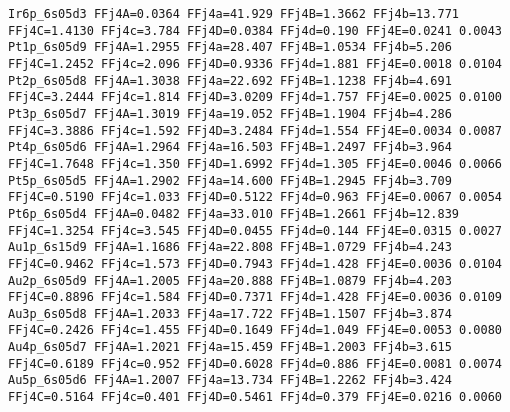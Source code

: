 {\begin{verbatim}
Ir6p_6s05d3 FFj4A=0.0364 FFj4a=41.929 FFj4B=1.3662 FFj4b=13.771 FFj4C=1.4130 FFj4c=3.784 FFj4D=0.0384 FFj4d=0.190 FFj4E=0.0241 0.0043 
Pt1p_6s05d9 FFj4A=1.2955 FFj4a=28.407 FFj4B=1.0534 FFj4b=5.206 FFj4C=1.2452 FFj4c=2.096 FFj4D=0.9336 FFj4d=1.881 FFj4E=0.0018 0.0104 
Pt2p_6s05d8 FFj4A=1.3038 FFj4a=22.692 FFj4B=1.1238 FFj4b=4.691 FFj4C=3.2444 FFj4c=1.814 FFj4D=3.0209 FFj4d=1.757 FFj4E=0.0025 0.0100 
Pt3p_6s05d7 FFj4A=1.3019 FFj4a=19.052 FFj4B=1.1904 FFj4b=4.286 FFj4C=3.3886 FFj4c=1.592 FFj4D=3.2484 FFj4d=1.554 FFj4E=0.0034 0.0087 
Pt4p_6s05d6 FFj4A=1.2964 FFj4a=16.503 FFj4B=1.2497 FFj4b=3.964 FFj4C=1.7648 FFj4c=1.350 FFj4D=1.6992 FFj4d=1.305 FFj4E=0.0046 0.0066 
Pt5p_6s05d5 FFj4A=1.2902 FFj4a=14.600 FFj4B=1.2945 FFj4b=3.709 FFj4C=0.5190 FFj4c=1.033 FFj4D=0.5122 FFj4d=0.963 FFj4E=0.0067 0.0054 
Pt6p_6s05d4 FFj4A=0.0482 FFj4a=33.010 FFj4B=1.2661 FFj4b=12.839 FFj4C=1.3254 FFj4c=3.545 FFj4D=0.0455 FFj4d=0.144 FFj4E=0.0315 0.0027 
Au1p_6s15d9 FFj4A=1.1686 FFj4a=22.808 FFj4B=1.0729 FFj4b=4.243 FFj4C=0.9462 FFj4c=1.573 FFj4D=0.7943 FFj4d=1.428 FFj4E=0.0036 0.0104 
Au2p_6s05d9 FFj4A=1.2005 FFj4a=20.888 FFj4B=1.0879 FFj4b=4.203 FFj4C=0.8896 FFj4c=1.584 FFj4D=0.7371 FFj4d=1.428 FFj4E=0.0036 0.0109 
Au3p_6s05d8 FFj4A=1.2033 FFj4a=17.722 FFj4B=1.1507 FFj4b=3.874 FFj4C=0.2426 FFj4c=1.455 FFj4D=0.1649 FFj4d=1.049 FFj4E=0.0053 0.0080 
Au4p_6s05d7 FFj4A=1.2021 FFj4a=15.459 FFj4B=1.2003 FFj4b=3.615 FFj4C=0.6189 FFj4c=0.952 FFj4D=0.6028 FFj4d=0.886 FFj4E=0.0081 0.0074 
Au5p_6s05d6 FFj4A=1.2007 FFj4a=13.734 FFj4B=1.2262 FFj4b=3.424 FFj4C=0.5164 FFj4c=0.401 FFj4D=0.5461 FFj4d=0.379 FFj4E=0.0216 0.0060 


\end{verbatim}
}
